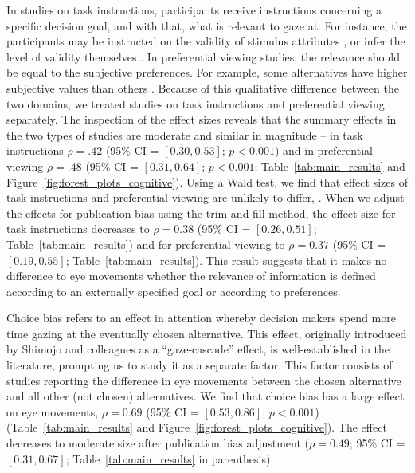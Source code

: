 \documentclass[english,natbib,man,floatsintext]{apa6}
\begin{document}
In studies on task instructions, participants receive instructions concerning a specific decision goal, and with that, what is relevant to gaze at. For instance, the participants may be instructed on the validity of stimulus attributes \citep{krefeld-schwalb2019a}, or infer the level of validity themselves \citep{bialkova2014a}. In preferential viewing studies, the relevance should be equal to the subjective preferences. For example, some alternatives have higher subjective values than others \citep{kim2012a}. Because of this qualitative difference between the two domains, we treated studies on task instructions and preferential viewing separately. The inspection of the effect sizes reveals that the summary effects in the two types of studies are moderate and similar in magnitude -- in task instructions $\rho = .42$ (95\% CI = $[0.30,0.53]$; $p<0.001$) and in preferential viewing $\rho = .48$ (95\% CI = $[0.31,0.64]$; $p<0.001$; Table~\ref{tab:main_results} and Figure~\ref{fig:forest_plots_cognitive}). Using a Wald test, we find that effect sizes of task instructions and preferential viewing are unlikely to differ, . When we adjust the effects for publication bias using the trim and fill method, the effect size for task instructions decreases to $\rho = 0.38$ (95\% CI = $[0.26,0.51]$; Table~\ref{tab:main_results}) and for preferential viewing to $\rho = 0.37$ (95\% CI = $[0.19,0.55]$; Table~\ref{tab:main_results}). This result suggests that it makes no difference to eye movements whether the relevance of information is defined according to an externally specified goal or according to preferences. 

Choice bias refers to an effect in attention whereby decision makers spend more time gazing at the eventually chosen alternative. This effect, originally introduced by Shimojo and colleagues \citep{shimojo2003a} as a ``gaze-cascade'' effect, is well-established in the literature, prompting us to study it as a separate factor. This factor consists of studies reporting the difference in eye movements between the chosen alternative and all other (not chosen) alternatives. We find that choice bias has a large effect on eye movements, $\rho = 0.69$ (95\% CI = $[0.53,0.86]$; $p<0.001$) (Table~\ref{tab:main_results} and Figure~\ref{fig:forest_plots_cognitive}). The effect decreases to moderate size after publication bias adjustment ($\rho = 0.49$; 95\% CI = $[0.31,0.67]$; Table~\ref{tab:main_results} in parenthesis)
\end{document}
